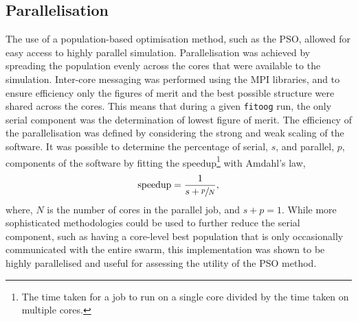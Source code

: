 \subsection{Parallelisation}
\label{sec:para}
The use of a population-based optimisation method, such as the PSO, allowed for easy access to highly parallel simulation.
Parallelisation was achieved by spreading the population evenly across the cores that were available to the simulation.
Inter-core messaging was performed using the MPI libraries, and to ensure efficiency only the figures of merit and the best possible structure were shared across the cores.
This means that during a given \texttt{fitoog} run, the only serial component was the determination of lowest figure of merit.
The efficiency of the parallelisation was defined by considering the strong and weak scaling of the software.
It was possible to determine the percentage of serial, $s$, and parallel, $p$, components of the software by fitting the speedup\footnote{The time taken for a job to run on a single core divided by the time taken on multiple cores.} with Amdahl's law,\autocite{amdahl_validity_1967}
%
\begin{equation}
\text{speedup} = \frac{1}{s + \sfrac{p}{N}},
\end{equation}
%
where, $N$ is the number of cores in the parallel job, and $s + p = 1$.
While more sophisticated methodologies could be used to further reduce the serial component, such as having a core-level best population that is only occasionally communicated with the entire swarm, this implementation was shown to be highly parallelised and useful for assessing the utility of the PSO method.
